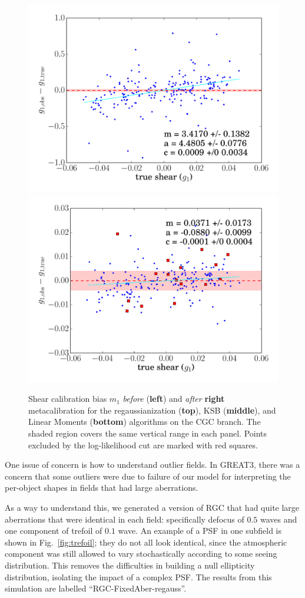 \documentclass[iop]{emulateapj}
\begin{document}
\begin{figure}[t]
\begin{center}
\includegraphics[width=0.46\linewidth]{./Plots/m1-no_corrections-moments.pdf}
\includegraphics[width=0.46\linewidth]{./Plots/m1-moments-opt-shear_plots.pdf}
\end{center}
\caption{Shear calibration bias $m_1$ {\it before} ({\bf left}) and
  {\it after} {\bf right} metacalibration for the regaussianization
  ({\bf top}), KSB ({\bf middle}), and Linear Moments ({\bf bottom})
  algorithms on the CGC branch. The shaded region covers the same
  vertical range in each panel.  Points excluded by the log-likelihood
  cut are marked with red squares.}
\label{fig:m_comparison}
\end{figure}

One issue of concern is how to understand outlier fields.  In GREAT3,
there was a concern that some outliers were due to failure of our
model for interpreting the per-object shapes in fields that had large
aberrations.

As a way to understand this, we generated a version of RGC that had
quite large aberrations that were identical in each field:
specifically defocus of $0.5$ waves and one component of trefoil of
$0.1$ wave.  An example of a PSF in one subfield is shown in
Fig.~\ref{fig:trefoil}; they do not all look identical, since the
atmospheric component was still allowed to vary stochastically
according to some seeing distribution. This removes the difficulties
in building a null ellipticity distribution, isolating the impact of a
complex PSF. The results from this simulation are labelled
``RGC-FixedAber-regauss''.
\end{document}
